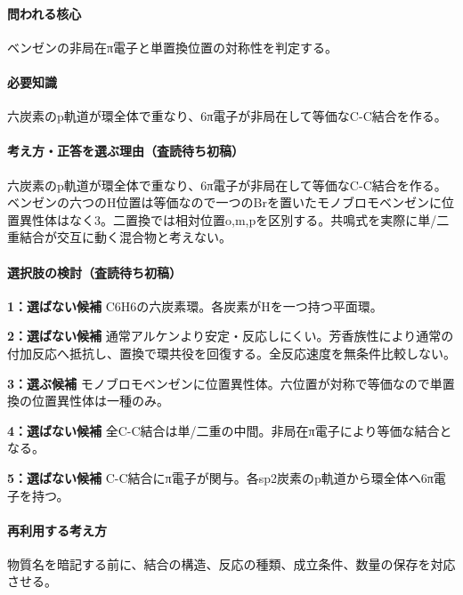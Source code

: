 \paragraph{問われる核心} ベンゼンの非局在π電子と単置換位置の対称性を判定する。

\paragraph{必要知識} 六炭素のp軌道が環全体で重なり、6π電子が非局在して等価なC-C結合を作る。

\paragraph{考え方・正答を選ぶ理由（査読待ち初稿）} 六炭素のp軌道が環全体で重なり、6π電子が非局在して等価なC-C結合を作る。ベンゼンの六つのH位置は等価なので一つのBrを置いたモノブロモベンゼンに位置異性体はなく3。二置換では相対位置o,m,pを区別する。共鳴式を実際に単/二重結合が交互に動く混合物と考えない。

\paragraph{選択肢の検討（査読待ち初稿）}\mbox{}\par

\noindent\textbf{1：選ばない候補} C6H6の六炭素環。各炭素がHを一つ持つ平面環。\par

\noindent\textbf{2：選ばない候補} 通常アルケンより安定・反応しにくい。芳香族性により通常の付加反応へ抵抗し、置換で環共役を回復する。全反応速度を無条件比較しない。\par

\noindent\textbf{3：選ぶ候補} モノブロモベンゼンに位置異性体。六位置が対称で等価なので単置換の位置異性体は一種のみ。\par

\noindent\textbf{4：選ばない候補} 全C-C結合は単/二重の中間。非局在π電子により等価な結合となる。\par

\noindent\textbf{5：選ばない候補} C-C結合にπ電子が関与。各sp2炭素のp軌道から環全体へ6π電子を持つ。\par

\paragraph{再利用する考え方} 物質名を暗記する前に、結合の構造、反応の種類、成立条件、数量の保存を対応させる。

